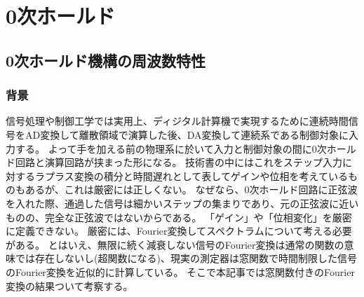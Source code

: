 \chapter{0次ホールド}
    \section{0次ホールド機構の周波数特性}
        \subsection{背景}
            信号処理や制御工学では実用上、ディジタル計算機で実現するために連続時間信号をAD変換して離散領域で演算した後、DA変換して連続系である制御対象に入力する。
            よって手を加える前の物理系に於いて入力と制御対象の間に0次ホールド回路と演算回路が挟まった形になる。
            技術書の中にはこれをステップ入力に対するラプラス変換の積分と時間遅れとして表してゲインや位相を考えているものもあるが、これは厳密には正しくない。
            なぜなら、0次ホールド回路に正弦波を入れた際、通過した信号は細かいステップの集まりであり、元の正弦波に近いものの、完全な正弦波ではないからである。
            「ゲイン」や「位相変化」を厳密に定義できない。
            厳密には、Fourier変換してスペクトラムについて考える必要がある。
            とはいえ、無限に続く減衰しない信号のFourier変換は通常の関数の意味では存在しないし(超関数になる)、現実の測定器は窓関数で時間制限した信号のFourier変換を近似的に計算している。
            そこで本記事では窓関数付きのFourier変換の結果ついて考察する。
